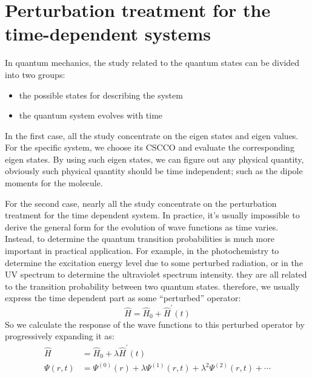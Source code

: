 %
%
%
%
%
\chapter{Perturbation treatment for the time-dependent systems}
\label{perturbation_in_time}
%
%
In quantum mechanics, the study related to the quantum states can be
divided into two groups:
\begin{itemize}
  \item the possible states for describing the system
  \item the quantum system evolves with time
\end{itemize}

In the first case, all the study concentrate on the eigen states and
eigen values. For the specific system, we choose its CSCCO and
evaluate the corresponding eigen states. By using such eigen states,
we can figure out any physical quantity, obviously such physical
quantity should be time independent; such as the dipole moments for
the molecule.

For the second case, nearly all the study concentrate on the
perturbation treatment for the time dependent system. In practice,
it's usually impossible to derive the general form for the evolution
of wave functions as time varies. Instead, to determine the quantum
transition probabilities is much more important in practical
application. For example, in the photochemistry to determine the
excitation energy level due to some perturbed radiation, or in the
UV spectrum to determine the ultraviolet spectrum intensity. they
are all related to the transition probability between two quantum
states. therefore, we usually express the time dependent part as
some ``perturbed'' operator:
\begin{equation}\label{}
\hat{H} = \hat{H}_{0} + \hat{H}^{'}(t)
\end{equation}
So we calculate the response of the wave functions to this perturbed
operator by progressively expanding it as:
\begin{align}\label{}
\hat{H} &= \hat{H}_{0} + \lambda\hat{H}^{'}(t) \nonumber \\
\Psi(r,t) &= \Psi^{(0)}(r) + \lambda\Psi^{(1)}(r,t) +
\lambda^{2}\Psi^{(2)}(r,t) + \cdots
\end{align}

